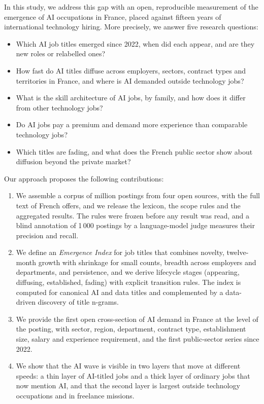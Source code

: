 \documentclass[5p,times,twocolumn,authoryear]{elsarticle}
\newcommand{\RQ}[1]{\textbf{RQ#1}}
\begin{document}
In this study, we address this gap with an open, reproducible measurement of the emergence of AI occupations in France, placed against fifteen years of international technology hiring. More precisely, we answer five research questions:
\begin{itemize}[leftmargin=2.6em]
\item[\RQ{1}] Which AI job titles emerged since 2022, when did each appear, and are they new roles or relabelled ones?
\item[\RQ{2}] How fast do AI titles diffuse across employers, sectors, contract types and territories in France, and where is AI demanded outside technology jobs?
\item[\RQ{3}] What is the skill architecture of AI jobs, by family, and how does it differ from other technology jobs?
\item[\RQ{4}] Do AI jobs pay a premium and demand more experience than comparable technology jobs?
\item[\RQ{5}] Which titles are fading, and what does the French public sector show about diffusion beyond the private market?
\end{itemize}

Our approach proposes the following contributions:
\begin{enumerate}
\item We assemble a corpus of \nAll{} million postings from four open sources, with the full text of \nFT{} French offers, and we release the lexicon, the scope rules and the aggregated results. The rules were frozen before any result was read, and a blind annotation of 1\,000 postings by a language-model judge measures their precision and recall.
\item We define an \emph{Emergence Index} for job titles that combines novelty, twelve-month growth with shrinkage for small counts, breadth across employers and departments, and persistence, and we derive lifecycle stages (appearing, diffusing, established, fading) with explicit transition rules. The index is computed for \nStages{} canonical AI and data titles and complemented by a data-driven discovery of title n-grams.
\item We provide the first open cross-section of AI demand in France at the level of the posting, with sector, region, department, contract type, establishment size, salary and experience requirement, and the first public-sector series since 2022.
\item We show that the AI wave is visible in two layers that move at different speeds: a thin layer of AI-titled jobs and a thick layer of ordinary jobs that now mention AI, and that the second layer is largest outside technology occupations and in freelance missions.
\end{enumerate}
\end{document}
